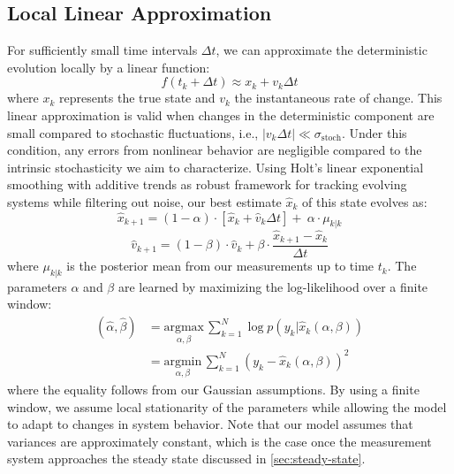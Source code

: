\documentclass[9pt, twocolumn,superscriptaddress]{revtex4}
\begin{document}
\subsection{Local Linear Approximation}\label{sec:local-linear}
For sufficiently small time intervals $\Delta t$, we can approximate the deterministic evolution locally by a linear function:
\begin{equation}
f(t_k + \Delta t) \approx x_k + v_k \Delta t
\end{equation}
where $x_k$ represents the true state and $v_k$ the instantaneous rate of change. This linear approximation is valid when changes in the deterministic component are small compared to stochastic fluctuations, i.e., $|v_k\Delta t| \ll \sigma_\text{stoch}$. Under this condition, any errors from nonlinear behavior are negligible compared to the intrinsic stochasticity we aim to characterize. Using Holt's linear exponential smoothing \cite{holt2004forecasting} with additive trends as robust framework for tracking evolving systems while filtering out noise, our best estimate $\hat{x}_k$ of this state evolves as:
\begin{equation}
\hat{x}_{k+1} = (1-\alpha) \cdot [\hat{x}_k + \hat{v}_k\Delta t] +\ \alpha \cdot \mu_{k|k}
\end{equation}
\begin{equation}
\hat{v}_{k+1} = (1-\beta) \cdot \hat{v}_k + \beta\cdot\frac{\hat{x}_{k+1}-\hat{x}_k}{\Delta t}
\end{equation}
where $\mu_{k|k}$ is the posterior mean from our measurements up to time $t_k$. The parameters $\alpha$ and $\beta$ are learned by maximizing the log-likelihood over a finite window:
\begin{equation}
\begin{aligned}
(\hat\alpha, \hat\beta) &= \underset{\alpha, \beta}{\text{argmax}} \, \sum_{k=1}^N \log p(y_k | \hat{x}_k(\alpha, \beta)) \\
&= \underset{\alpha, \beta}{\text{argmin}} \, \sum_{k=1}^N (y_k - \hat{x}_k(\alpha, \beta))^2
\end{aligned}
\end{equation}
where the equality follows from our Gaussian assumptions. By using a finite window, we assume local stationarity of the parameters while allowing the model to adapt to changes in system behavior. Note that our model assumes that variances are approximately constant, which is the case once the measurement system approaches the steady state discussed in \cref{sec:steady-state}.
\end{document}
